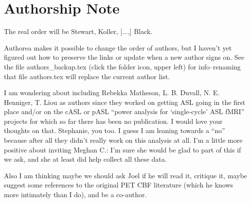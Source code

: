 \section*{Authorship Note}
The real order will be Stewart, Koller, [...,] Black.

Authorea makes it possible to change the order of authors, but I haven't yet figured out how to preserve the links or update when a new author signs on. See the file authors\_backup.tex (click the folder icon, upper left) for info--renaming that file authors.tex will replace the current author list.

I am wondering about including Rebekka Matheson, L. B. Duvall, N. E. Henniger, T. Liou as authors since they worked on getting ASL going in the first place and/or on the cASL or pASL ``power analysis for `single-cycle' ASL fMRI'' projects for which so far there has been no publication. I would love your thoughts on that. Stephanie, you too. I guess I am leaning towards a ``no'' because after all they didn't really work on this analysis at all. I'm a little more positive about inviting Meghan C.: I'm sure she would be glad to part of this if we ask, and she at least did help collect all these data. 

Also I am thinking maybe we should ask Joel if he will read it, critique it, maybe suggest some references to the original PET CBF literature (which he knows more intimately than I do), and be a co-author. 